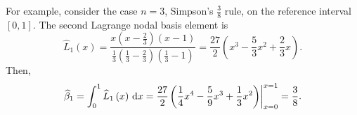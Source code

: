 \begin{frame}
\begin{example}[Newton-Cotes quadrature rules of order $n=1,2$ and weight function $w\equiv 1$ on $\interval$]
        For example, consider the case $n=3$, Simpson's $\frac{3}{8}$
        rule, on the reference interval $\left[0,1\right]$.
        The second Lagrange nodal basis element is
        \begin{equation*}
            \widehat{L}_{1}\left(x\right)=
            \dfrac{
                x
                \left(x-\frac{2}{3}\right)
                \left(x-1\right)
            }{
                \frac{1}{3}
                \left(\frac{1}{3}-\frac{2}{3}\right)
                \left(\frac{1}{3}-1\right)
            }=
            \dfrac{27}{2}
            \left(
            x^{3}-\dfrac{5}{3}x^{2}+\dfrac{2}{3}x
            \right).
        \end{equation*}
        Then,
        \begin{equation*}
            \widehat{\beta}_{1}=
            \int_{0}^{1}
            \widehat{L}_{1}\left(x\right)
            \dl x=
            \dfrac{27}{2}
            {\left.
                \left(
                \dfrac{1}{4}x^{4}-
                \dfrac{5}{9}x^{3}+
                \dfrac{1}{3}x^{2}
                \right)
                \right|}_{x=0}^{x=1}=
            \dfrac{3}{8}.
        \end{equation*}
    \end{example}
\end{frame}

